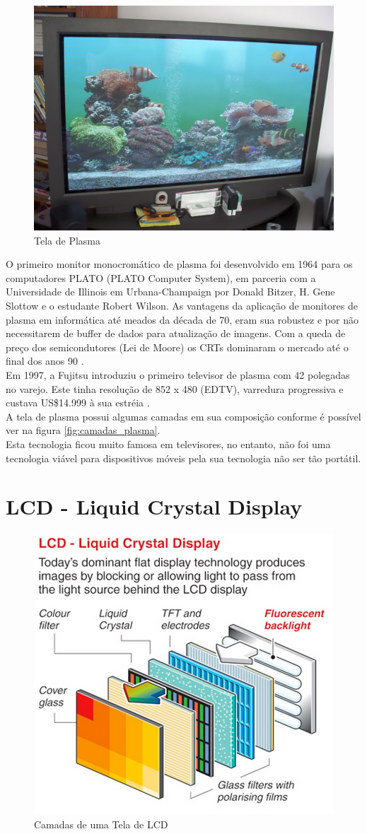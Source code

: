 \begin{figure}[!ht]
  \centering
  \includegraphics[width=.40\textwidth]{./figuras/plasma_display} 
  \caption{Tela de Plasma}
  \label{fig:plasma_display} 
\end{figure}

O primeiro monitor monocromático de plasma foi desenvolvido em 1964 para os computadores PLATO (PLATO Computer System), em parceria com a Universidade de Illinois em Urbana-Champaign por Donald Bitzer, H. Gene Slottow e o estudante Robert Wilson. As vantagens da aplicação de monitores de plasma em informática até meados da década de 70, eram sua robustez e por não necessitarem de buffer de dados para atualização de imagens. Com a queda de preço dos semicondutores (Lei de Moore) os CRTs dominaram o mercado até o final dos anos 90 \cite{WikipediaTelaPlasma}.\\

Em 1997, a Fujitsu introduziu o primeiro televisor de plasma com 42 polegadas no varejo. Este tinha resolução de 852 x 480 (EDTV), varredura progressiva e custava US\$14.999 à sua estréia \cite{WikipediaTelaPlasma}.\\

A tela de plasma possui algumas camadas em sua composição conforme é possível ver na figura \ref{fig:camadas_plasma}.\\

Esta tecnologia ficou muito famosa em televisores, no entanto, não foi uma tecnologia viável para dispositivos móveis pela sua tecnologia não ser tão portátil. 


\section{LCD - Liquid Crystal Display}
\label{sec:lcd}

\begin{figure}[!ht]
  \centering
  \includegraphics[width=.40\textwidth]{./figuras/camadas_lcd} 
  \caption{Camadas de uma Tela de LCD}
  \label{fig:camadas_lcd} 
\end{figure}

